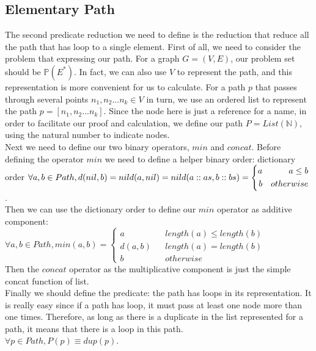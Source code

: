 \documentclass[a4paper,10pt]{article}
\begin{document}
\subsection{Elementary Path}
The second predicate reduction we need to define is the reduction that reduce all the path that has loop to a single element. First of all, we need to consider the problem that expressing our path. For a graph $G = (V,E)$, our problem set should be $\mathbb{P}(E^*)$. In fact, we can also use $V$ to represent the path, and this representation is more convenient for us to calculate. For a path $p$ that passes through several points $n_1,n_2 ... n_k \in V$ in turn, we use an ordered list to represent the path $p = [n_1,n_2 ... n_k]$. 
Since the node here is just a reference for a name, in order to facilitate our proof and calculation, we define our path $P = List(\mathbb{N})$, using the natural number to indicate nodes.\\
Next we need to define our two binary operators, $min$ and $concat$. 
Before defining the operator $min$ we need to define a helper binary order: dictionary order $\forall a,b \in Path,\\ d(nil,b) = nil\\
d(a,nil) = nil\\
d(a::as,b::bs) =
\left\{
\begin{aligned}
a &  & a \leq b \\
b &  & otherwise 
\end{aligned}
\right.$.\\
Then we can use the dictionary order to define our $min$ operator as additive component: \\
$\forall a,b \in Path, min(a,b) = \left\{
\begin{aligned}
a &  & length(a) \leq length(b) \\
d(a,b) &  & length(a) = length(b) \\
b &  & otherwise 
\end{aligned}
\right.$\\
Then the $concat$ operator as the multiplicative component is just the simple concat function of list.\\
Finally we should define the predicate: the path has loops in its representation. It is really easy since if a path has loop, it must pass at least one node more than one times. 
Therefore, as long as there is a duplicate in the list represented for a path, it means that there is a loop in this path.\\
$\forall p \in Path, P(p) \equiv dup(p)$.\\
\end{document}
